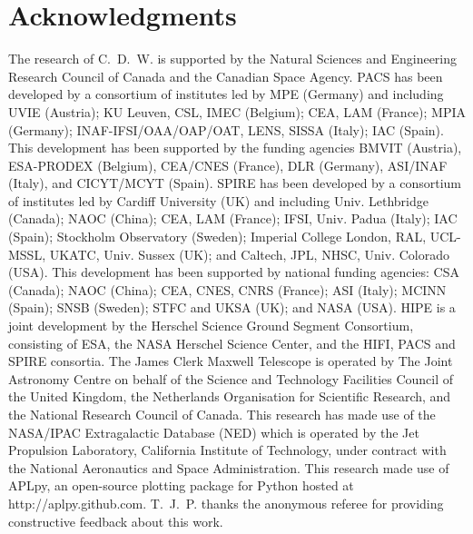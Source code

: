 \section*{Acknowledgments}
The research of C.~D.~W. is supported by the Natural Sciences and Engineering Research Council of Canada and the Canadian Space Agency.  PACS has been developed by a consortium of institutes led by MPE (Germany) and including UVIE (Austria); KU Leuven, CSL, IMEC (Belgium); CEA, LAM (France); MPIA (Germany); INAF-IFSI/OAA/OAP/OAT, LENS, SISSA (Italy); IAC (Spain). This development has been supported by the funding agencies BMVIT (Austria), ESA-PRODEX (Belgium), CEA/CNES (France), DLR (Germany), ASI/INAF (Italy), and CICYT/MCYT (Spain).  SPIRE has been developed by a consortium of institutes led by Cardiff University (UK) and including Univ. Lethbridge (Canada); NAOC (China); CEA, LAM (France); IFSI, Univ. Padua (Italy); IAC (Spain); Stockholm Observatory (Sweden); Imperial College London, RAL, UCL-MSSL, UKATC, Univ. Sussex (UK); and Caltech, JPL, NHSC, Univ. Colorado (USA). This development has been supported by national funding agencies: CSA (Canada); NAOC (China); CEA, CNES, CNRS (France); ASI (Italy); MCINN (Spain); SNSB (Sweden); STFC and UKSA (UK); and NASA (USA).  HIPE is a joint development by the Herschel Science Ground Segment Consortium, consisting of ESA, the NASA Herschel Science Center, and the HIFI, PACS and SPIRE consortia.  The James Clerk Maxwell Telescope is operated by The Joint Astronomy Centre on behalf of the Science and Technology Facilities Council of the United Kingdom, the Netherlands Organisation for Scientific Research, and the National Research Council of Canada. This research has made use of the NASA/IPAC Extragalactic Database (NED) which is operated by the Jet Propulsion Laboratory, California Institute of Technology, under contract with the National Aeronautics and Space Administration.  This research made use of APLpy, an open-source plotting package for Python hosted at http://aplpy.github.com.  T.~J.~P. thanks the anonymous referee for providing constructive feedback about this work.



